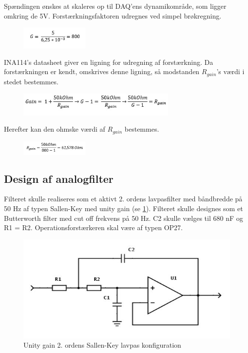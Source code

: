 Spændingen ønskes at skaleres op til DAQ’ens dynamikområde, som ligger omkring de 5V. Forstærkningsfaktoren udregnes ved simpel brøkregning. \\

\begin{figure}[H]
	\centering
	\includegraphics[width=0.3\textwidth]{Figurer/Hardware/ligningtilgain}
\end{figure}

INA114’s datasheet giver en ligning for udregning af forstærkning. Da forstærkningen er kendt, omskrives denne ligning, så modstanden $R_{gain}$’s værdi i stedet bestemmes.\\

\begin{figure}[H]
	\centering
	\includegraphics[width=0.7\textwidth]{Figurer/Hardware/omskrivningtilgain}
\end{figure}

Herefter kan den ohmske værdi af $R_{gain}$ bestemmes.\\

\begin{figure}[H]
	\centering
	\includegraphics[width=0.3\textwidth]{Figurer/Hardware/udregningafgain}
\end{figure}

\subsection{Design af analogfilter}
Filteret skulle realiseres som et aktivt 2. ordens lavpasfilter med båndbredde på 50 Hz af typen Sallen-Key med unity gain (se \ref{fig:Filter}). Filteret skulle designes som et Butterworth filter med cut off frekvens på 50 Hz. C2 skulle vælges til 680 nF og R1 = R2. Operationsforstærkeren skal være af typen OP27.  

\begin{figure}[H]
	\centering
	\includegraphics[width=1\textwidth]{Figurer/Hardware/FilterDesign}
	\caption{Unity gain 2. ordens Sallen-Key lavpas konfiguration}
	\label{fig:Filter}
\end{figure}

